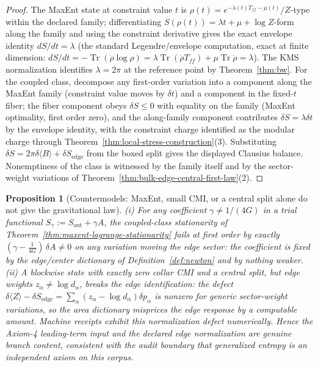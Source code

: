 \documentclass[11pt]{article}
\newtheorem{proposition}[theorem]{Proposition}
\begin{document}
\begin{proof}
The MaxEnt state at constraint value \(t\) is
\(\rho(t)=e^{-\lambda(t)T_{ff}-\mu(t)}/Z\)-type within the declared family;
differentiating \(S(\rho(t))=\lambda t+\mu+\log Z\)-form along the family and
using the constraint derivative gives the exact envelope identity
\(dS/dt=\lambda\) (the standard Legendre/envelope computation, exact at
finite dimension: \(dS/dt=-\operatorname{Tr}(\dot\rho\log\rho)
=\lambda\operatorname{Tr}(\dot\rho T_{ff})+\mu\operatorname{Tr}\dot\rho
=\lambda\)). The KMS normalization identifies \(\lambda=2\pi\) at the
reference point by Theorem~\ref{thm:bw}. For the coupled class, decompose any
first-order variation into a component along the MaxEnt family (constraint
value moves by \(\delta t\)) and a component in the fixed-\(t\) fiber;
the fiber component obeys \(\delta S\leq0\) with equality on the family
(MaxEnt optimality, first order zero), and the along-family component
contributes \(\delta S=\lambda\delta t\) by the envelope identity, with the
constraint charge identified as the modular charge through
Theorem~\ref{thm:local-stress-construction}(3). Substituting
\(\delta S=2\pi\delta\langle B\rangle+\delta S_{\mathrm{edge}}\) from the
boxed split gives the displayed Clausius balance. Nonemptiness of the class is
witnessed by the family itself and by the sector-weight variations of
Theorem~\ref{thm:bulk-edge-central-first-law}(2).
\end{proof}

\begin{proposition}[Countermodels: MaxEnt, small CMI, or a central split alone do not give the gravitational law]
\label{prop:entropy-coefficient-countermodel}
(i) For any coefficient \(\gamma\neq1/(4G)\) in a trial functional
\(S_\gamma:=S_{\mathrm{out}}+\gamma A\), the coupled-class stationarity of
Theorem~\ref{thm:maxent-lagrange-stationarity} fails at first order by
exactly \((\gamma-\tfrac1{4G})\,\delta A\neq0\) on any variation moving the
edge sector: the coefficient is fixed by the edge/center dictionary of
Definition~\ref{def:newton} and by nothing weaker. (ii) A blockwise state
with exactly zero collar CMI and a central split, but edge weights
\(z_\alpha\neq\log d_\alpha\), breaks the edge identification: the defect
\(\delta\langle Z\rangle-\delta S_{\mathrm{edge}}
=\sum_\alpha(z_\alpha-\log d_\alpha)\delta p_\alpha\)
is nonzero for generic sector-weight variations, so the area dictionary
misprices the edge response by a computable amount. Machine receipts exhibit
this normalization defect numerically. Hence the
Axiom-4 leading-term input and the declared edge normalization are genuine
branch content, consistent with the audit boundary that generalized entropy
is an independent axiom on this corpus.
\end{proposition}
\end{document}
